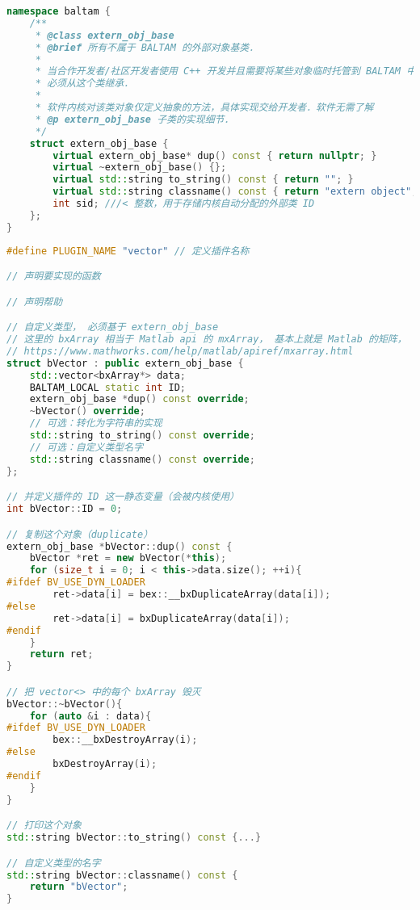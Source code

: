 
\begin{issues}
\issueDraft
\end{issues}

\begin{lstlisting}[language=cpp, caption=extern\_obj.h节选]
namespace baltam {
    /**
     * @class extern_obj_base
     * @brief 所有不属于 BALTAM 的外部对象基类．
     *
     * 当合作开发者/社区开发者使用 C++ 开发并且需要将某些对象临时托管到 BALTAM 中时，
     * 必须从这个类继承．
     *
     * 软件内核对该类对象仅定义抽象的方法，具体实现交给开发者．软件无需了解
     * @p extern_obj_base 子类的实现细节．
     */
    struct extern_obj_base {
        virtual extern_obj_base* dup() const { return nullptr; }
        virtual ~extern_obj_base() {};
        virtual std::string to_string() const { return ""; }
        virtual std::string classname() const { return "extern object"; };
        int sid; ///< 整数，用于存储内核自动分配的外部类 ID
    };
}
\end{lstlisting}


\begin{lstlisting}[language=cpp,caption=vector 插件的 main.cpp]
#define PLUGIN_NAME "vector" // 定义插件名称

// 声明要实现的函数

// 声明帮助

// 自定义类型， 必须基于 extern_obj_base
// 这里的 bxArray 相当于 Matlab api 的 mxArray， 基本上就是 Matlab 的矩阵， 什么都能装．
// https://www.mathworks.com/help/matlab/apiref/mxarray.html
struct bVector : public extern_obj_base {
    std::vector<bxArray*> data;
    BALTAM_LOCAL static int ID;
    extern_obj_base *dup() const override;
    ~bVector() override;
    // 可选：转化为字符串的实现
    std::string to_string() const override;
    // 可选：自定义类型名字
    std::string classname() const override;
};

// 并定义插件的 ID 这一静态变量（会被内核使用）
int bVector::ID = 0;

// 复制这个对象（duplicate）
extern_obj_base *bVector::dup() const {
    bVector *ret = new bVector(*this);
    for (size_t i = 0; i < this->data.size(); ++i){
#ifdef BV_USE_DYN_LOADER
        ret->data[i] = bex::__bxDuplicateArray(data[i]);
#else
        ret->data[i] = bxDuplicateArray(data[i]);
#endif
    }
    return ret;
}

// 把 vector<> 中的每个 bxArray 毁灭
bVector::~bVector(){
    for (auto &i : data){
#ifdef BV_USE_DYN_LOADER
        bex::__bxDestroyArray(i);
#else
        bxDestroyArray(i);
#endif
    }
}

// 打印这个对象
std::string bVector::to_string() const {...}

// 自定义类型的名字
std::string bVector::classname() const {
    return "bVector";
}
\end{lstlisting}